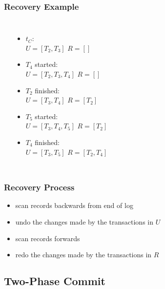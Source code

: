 \documentclass[dvipsnames]{beamer}
\theoremstyle{plain}
\begin{document}
\begin{frame}
  \frametitle{Recovery Example}

  \begin{columns}[t]
    \begin{center}
    \end{center}

    \pause
    \begin{itemize}
      \item $t_C$:\\
        $U=[T_2,T_3]$
        $R=[]$

      \pause
      \item $T_4$ started:\\
        $U=[T_2,T_3,T_4]$
        $R=[]$

      \pause
      \item $T_2$ finished:\\
        $U=[T_3,T_4]$
        $R=[T_2]$

      \pause
      \item $T_5$ started:\\
        $U=[T_3,T_4,T_5]$
        $R=[T_2]$

      \pause
      \item $T_4$ finished:\\
        $U=[T_3,T_5]$
        $R=[T_2,T_4]$
    \end{itemize}
  \end{columns}
\end{frame}

\begin{frame}
  \frametitle{Recovery Process}

  \begin{itemize}
    \item scan records backwards from end of log
    \item undo the changes made by the transactions in $U$

    \medskip
    \item scan records forwards
    \item redo the changes made by the transactions in $R$
  \end{itemize}
\end{frame}

\subsection{Two-Phase Commit}
\end{document}
